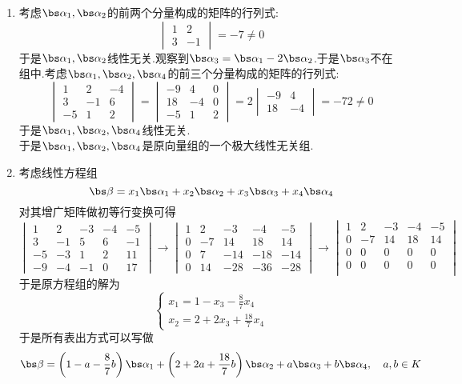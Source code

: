 \documentclass{ctexart}
\begin{document}
\begin{solution}
\begin{enumerate}[label=\tbf{(\arabic*)},topsep=0pt,parsep=0pt,itemsep=0pt,partopsep=0pt]
    \item 考虑$\bs\alpha_1,\bs\alpha_2$的前两个分量构成的矩阵的行列式:
    \[\begin{vmatrix}
        1&2\\3&-1
    \end{vmatrix}=-7\neq0\]
    于是$\bs\alpha_1,\bs\alpha_2$线性无关.观察到$\bs\alpha_3=\bs\alpha_1-2\bs\alpha_2$.于是$\bs\alpha_3$不在组中.考虑$\bs\alpha_1,\bs\alpha_2,\bs\alpha_4$的前三个分量构成的矩阵的行列式:
    \[\begin{vmatrix}
        1&2&-4\\
        3&-1&6\\
        -5&1&2
    \end{vmatrix}=\begin{vmatrix}
        -9&4&0\\
        18&-4&0\\
        -5&1&2
    \end{vmatrix}=2\begin{vmatrix}
        -9&4\\18&-4
    \end{vmatrix}=-72\neq0\]
    于是$\bs\alpha_1,\bs\alpha_2,\bs\alpha_4$线性无关.\\
    于是$\bs\alpha_1,\bs\alpha_2,\bs\alpha_4$是原向量组的一个极大线性无关组.
    \item 考虑线性方程组
    \[\bs\beta=x_1\bs\alpha_1+x_2\bs\alpha_2+x_3\bs\alpha_3+x_4\bs\alpha_4\]
    对其增广矩阵做初等行变换可得
    \[\begin{vmatrix}
        1&2&-3&-4&-5\\
        3&-1&5&6&-1\\
        -5&-3&1&2&11\\
        -9&-4&-1&0&17
    \end{vmatrix}\longrightarrow\begin{vmatrix}
        1&2&-3&-4&-5\\
        0&-7&14&18&14\\
        0&7&-14&-18&-14\\
        0&14&-28&-36&-28
    \end{vmatrix}\longrightarrow\begin{vmatrix}
        1&2&-3&-4&-5\\
        0&-7&14&18&14\\
        0&0&0&0&0\\
        0&0&0&0&0\\
    \end{vmatrix}\]
    于是原方程组的解为
    \[\left\{\begin{array}{l}
        x_1=1-x_3-\frac{8}{7}x_4\\
        x_2=2+2x_3+\frac{18}{7}x_4
    \end{array}\right.\]
    于是所有表出方式可以写做
    \[\bs\beta=\left(1-a-\dfrac87b\right)\bs\alpha_1+\left(2+2a+\dfrac{18}{7}b\right)\bs\alpha_2+a\bs\alpha_3+b\bs\alpha_4,\quad a,b\in K\]
\end{enumerate}
\end{solution}
\end{document}
